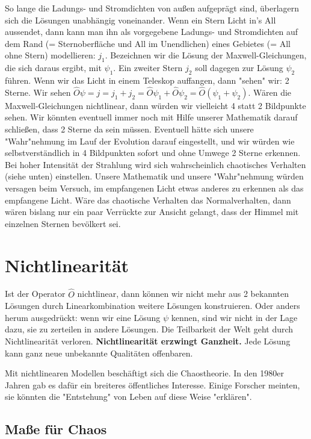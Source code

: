 \documentclass[12pt]{book}
\begin{document}
So lange die Ladungs- und Stromdichten von außen aufgeprägt sind, überlagern sich die Lösungen unabhängig voneinander. Wenn ein Stern Licht in's All aussendet, dann kann man ihn als vorgegebene Ladungs- und Stromdichten auf dem Rand (= Sternoberfläche und All im Unendlichen) eines Gebietes (= All ohne Stern) modellieren: $j_1$. Bezeichnen wir die Lösung der Maxwell-Gleichungen, die sich daraus ergibt, mit $\psi_1$. Ein zweiter Stern $j_2$ soll dagegen zur Lösung $\psi_2$ führen. Wenn wir das Licht in einem Teleskop auffangen, dann "sehen" wir: 2 Sterne. Wir sehen $\hat{O}\psi=j=j_1+j_2=\hat{O}\psi_1+\hat{O}\psi_2=\hat{O}(\psi_1+\psi_2)$. Wären die Maxwell-Gleichungen nichtlinear, dann würden wir vielleicht 4 statt 2 Bildpunkte sehen. Wir könnten eventuell immer noch mit Hilfe unserer Mathematik darauf schließen, dass 2 Sterne da sein müssen. Eventuell hätte sich unsere "Wahr"nehmung im Lauf der Evolution darauf eingestellt, und wir würden wie selbstverständlich in 4 Bildpunkten sofort und ohne Umwege 2 Sterne erkennen. Bei hoher Intensität der Strahlung wird sich wahrscheinlich chaotisches Verhalten (siehe unten) einstellen. Unsere Mathematik und unsere "Wahr"nehmung würden versagen beim Versuch, im empfangenen Licht etwas anderes zu erkennen als das empfangene Licht. Wäre das chaotische Verhalten das Normalverhalten, dann wären bislang nur ein paar Verrückte zur Ansicht gelangt, dass der Himmel mit einzelnen Sternen bevölkert sei.

\section{Nichtlinearität}

Ist der Operator $\hat{O}$ nichtlinear, dann können wir nicht mehr aus 2 bekannten Lösungen durch Linearkombination weitere Lösungen konstruieren. Oder anders herum ausgedrückt: wenn wir eine Lösung $\psi$ kennen, sind wir nicht in der Lage dazu, sie zu zerteilen in andere Lösungen. Die Teilbarkeit der Welt geht durch Nichtlinearität verloren. \textbf{Nichtlinearität erzwingt Ganzheit.} Jede Lösung kann ganz neue unbekannte Qualitäten offenbaren.

Mit nichtlinearen Modellen beschäftigt sich die Chaostheorie. In den 1980er Jahren gab es dafür ein breiteres öffentliches Interesse. Einige Forscher meinten, sie könnten die "Entstehung" von Leben auf diese Weise "erklären". 

\subsection{Maße für Chaos}
\end{document}
